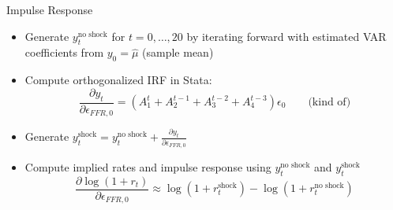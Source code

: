 \documentclass{beamer}
\begin{document}
\begin{frame}{Impulse Response}
\begin{itemize}
\item Generate $y_t^\text{no shock}$ for $t = 0, \ldots, 20$ by iterating forward with estimated VAR coefficients from $y_0 = \hat{\mu}$ (sample mean)
\item Compute orthogonalized IRF in Stata: $$\frac{\partial y_t}{\partial \epsilon_{FFR,0}} = (A_1^t + A_2^{t-1} + A_3^{t-2} + A_4^{t-3}) \epsilon_0 \qquad \text{(kind of)}$$
\item Generate $y_t^\text{shock} = y_t^\text{no shock} + \frac{\partial y_t}{\partial \epsilon_{FFR,0}}$
\item Compute implied rates and impulse response using $y_t^\text{no shock}$ and $y_t^\text{shock}$
$$\frac{\partial \log(1+r_t)}{\partial \epsilon_{FFR,0}} \approx \log(1 + r_t^\text{shock}) - \log(1 + r_t^\text{no shock})$$
\end{itemize}
\end{frame}
\end{document}
